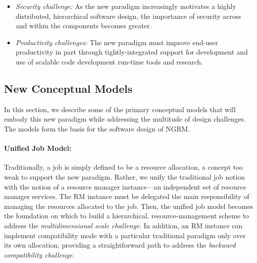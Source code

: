 \documentclass[10pt]{article}
\newif\ifcomments
\newcommand{\ngrm}{NGRM}
\begin{document}
\begin{itemize}
\item{\sl Security challenge:} As the new paradigm increasingly motivates
     a highly distributed, hierarchical software design, 
     the importance of security across and within the components becomes greater.

\item{\sl Productivity challenges:} The new paradigm must improve end-user 
     productivity in part through tightly-integrated support for development
     and use of scalable code development run-time tools and research.

\end{itemize}


\subsection{New Conceptual Models}
\label{sect:models}
In this section, we describe some of the primary conceptual models that will embody 
this new paradigm while addressing the multitude of design challenges. 
The models form the basis for the software design of \ngrm.

\ifcomments
\marginpar{\tiny {\bf ned-review:}
The discussion here doesn't really make much sense until you read section 4. I
would provide a forward reference to assure your readers that the concept will
be explained in more detail later on.}
\fi
\paragraph{Unified Job Model:}
Traditionally, a job is simply defined to be a resource allocation, 
a concept too weak to support the new paradigm. 
Rather, we unify the traditional job notion 
with the notion of a resource manager instance---an independent set of resource manager services.
The RM instance must be delegated the main responsibility of managing the resources allocated to the job.
Then, the unified job model becomes the foundation
on which to build a hierarchical, resource-management 
scheme to address the {\sl multidimensional scale challenge}.
In addition, an RM instance can implement compatibility mode with a particular 
traditional paradigm only over its own allocation, providing a straightforward path to address
the {\sl backward compatibility challenge}. 
\end{document}
